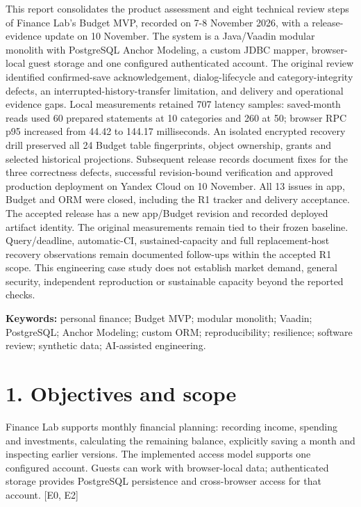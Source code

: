\documentclass[11pt,a4paper]{article}
\begin{document}
This report consolidates the product assessment and eight technical review steps of Finance Lab's Budget MVP, recorded on 7-8 November 2026, with a release-evidence update on 10 November. The system is a Java/\allowbreak{}Vaadin modular monolith with PostgreSQL Anchor Modeling, a custom JDBC mapper, browser-local guest storage and one configured authenticated account. The original review identified confirmed-save acknowledgement, dialog-lifecycle and category-integrity defects, an interrupted-history-transfer limitation, and delivery and operational evidence gaps. Local measurements retained 707 latency samples: saved-month reads used 60 prepared statements at 10 categories and 260 at 50; browser RPC p95 increased from 44.42 to 144.17 milliseconds. An isolated encrypted recovery drill preserved all 24 Budget table fingerprints, object ownership, grants and selected historical projections. Subsequent release records document fixes for the three correctness defects, successful revision-bound verification and approved production deployment on Yandex Cloud on 10 November. All 13 issues in app, Budget and ORM were closed, including the R1 tracker and delivery acceptance. The accepted release has a new app/\allowbreak{}Budget revision and recorded deployed artifact identity. The original measurements remain tied to their frozen baseline. Query/\allowbreak{}deadline, automatic-CI, sustained-capacity and full replacement-host recovery observations remain documented follow-ups within the accepted R1 scope. This engineering case study does not establish market demand, general security, independent reproduction or sustainable capacity beyond the reported checks.

\textbf{Keywords:} personal finance; Budget MVP; modular monolith; Vaadin; PostgreSQL; Anchor Modeling; custom ORM; reproducibility; resilience; software review; synthetic data; AI-assisted engineering.

\section*{1. Objectives and scope}

Finance Lab supports monthly financial planning: recording income, spending and investments, calculating the remaining balance, explicitly saving a month and inspecting earlier versions. The implemented access model supports one configured account. Guests can work with browser-local data; authenticated storage provides PostgreSQL persistence and cross-browser access for that account. [E0, E2]
\end{document}
